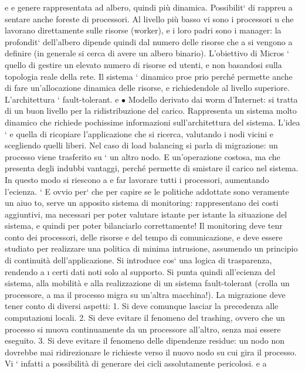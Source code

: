 \documentclass[a4paper,12pt]{article}
\begin{document}
e
e
genere rappresentata ad albero, quindi più dinamica. Possibilit` di rappreu
a
sentare anche foreste di processori. Al livello più basso vi sono i processori
u
che lavorano direttamente sulle risorse (worker), e i loro padri sono i manager: la profondit` dell'albero dipende
quindi dal numero delle risorse che
a
si vengono a definire (in generale si cerca di avere un albero binario). L'obiettivo di Micros ` quello di gestire un
elevato numero di risorse ed utenti,
e
non basandosi sulla topologia reale della rete. Il sistema ` dinamico proe
prio perché permette anche di fare un'allocazione dinamica delle risorse,
e
richiedendole al livello superiore. L'architettura ` fault-tolerant.
e
$\bullet$ Modello derivato dai worm d'Internet: si tratta di un buon livello per
la ridistribuzione del carico. Rappresenta un sistema molto dinamico che
richiede pochissime informazioni sull'architettura del sistema. L'idea `
e
quella di ricopiare l'applicazione che si ricerca, valutando i nodi vicini e
scegliendo quelli liberi.
Nel caso di load balancing si parla di migrazione: un processo viene trasferito su
`
un altro nodo. E un'operazione costosa, ma che presenta degli indubbi vantaggi,
perché permette di smistare il carico nel sistema. In questo modo si riescono a
e
far lavorare tutti i processori, aumentando l'ecienza.
`
E ovvio per` che per capire se le politiche addottate sono veramente un aiuo
to, serve un apposito sistema di monitoring: rappresentano dei costi aggiuntivi,
ma necessari per poter valutare istante per istante la situazione del sistema, e
quindi per poter bilanciarlo correttamente! Il monitoring deve tenr conto dei
processori, delle risorse e del tempo di comunicazione, e deve essere studiato per
realizzare una politica di minima intrusione, assumendo un principio di continuità dell'applicazione. Si introduce cos`
una logica di trasparenza, rendendo
a
\i{}
certi dati noti solo al supporto. Si punta quindi all'ecienza del sistema, alla
mobilità e alla realizzazione di un sistema fault-tolerant (crolla un processore,
a
ma il processo migra su un'altra macchina!).
La migrazione deve tener conto di diversi aspetti:
1. Si deve comunque lasciar la precedenza alle computazioni locali.
2. Si deve evitare il fenomeno del trashing, ovvero che un processo si muova
continuamente da un processore all'altro, senza mai essere eseguito.
3. Si deve evitare il fenomeno delle dipendenze residue: un nodo non dovrebbe
mai ridirezionare le richieste verso il nuovo nodo su cui gira il processo.
Vi ` infatti a possibilità di generare dei cicli assolutamente pericolosi.
e
a
\end{document}
